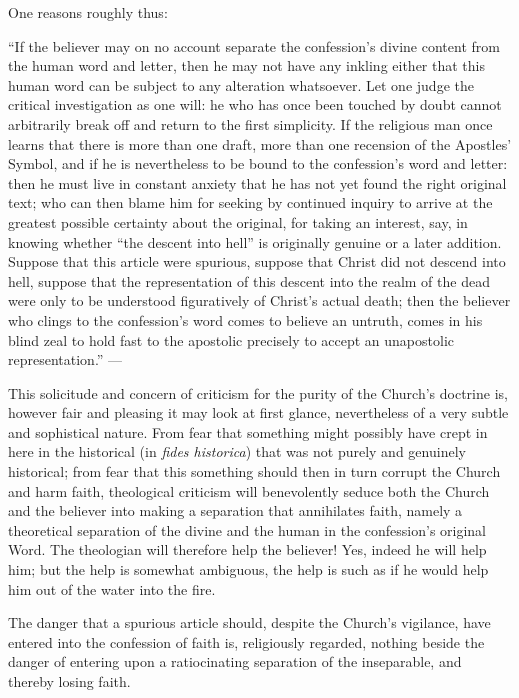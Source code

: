 \documentclass[12pt,a4paper]{book}
\begin{document}
One reasons roughly thus:

``If the believer may on no account separate the confession's divine content
from the human word and letter, then he may not have any inkling either that
this human word can be subject to any alteration whatsoever. Let one judge the
critical investigation as one will: he who has once been touched by doubt cannot
arbitrarily break off and return to the first simplicity. If the religious man
once learns that there is more than one draft, more than one recension of the
Apostles' Symbol, and if he is nevertheless to be bound to the confession's word
and letter: then he must live in constant anxiety that he has not yet found the
right original text; who can then blame him for seeking by continued inquiry to
arrive at the greatest possible certainty about the original, for taking an
interest, say, in knowing whether ``the descent into hell'' is originally
genuine or a later addition. Suppose that this article were spurious, suppose
that Christ did not descend into hell, suppose that the representation of this
descent into the realm of the dead were only to be understood figuratively of
Christ's actual death; then the believer who clings to the confession's word
comes to believe an untruth, comes in his blind zeal to hold fast to the
apostolic precisely to accept an unapostolic representation.'' ---

This solicitude and concern of criticism for the purity of the Church's doctrine
is, however fair and pleasing it may look at first glance, nevertheless of a
very subtle and sophistical nature. From fear that something might possibly have
crept in here
in the historical (in \textit{fides historica}) that was not purely and
genuinely historical; from fear that this something should then in turn corrupt
the Church and harm faith, theological criticism will benevolently seduce both
the Church and the believer into making a separation that annihilates faith,
namely a theoretical separation of the divine and the human in the confession's
original Word. The theologian will therefore help the believer! Yes, indeed he
will help him; but the help is somewhat ambiguous, the help is such as if he
would help him out of the water into the fire.

The danger that a spurious article should, despite the Church's vigilance, have
entered into the confession of faith is, religiously regarded, nothing beside
the danger of entering upon a ratiocinating separation of the inseparable, and
thereby losing faith.
\end{document}
